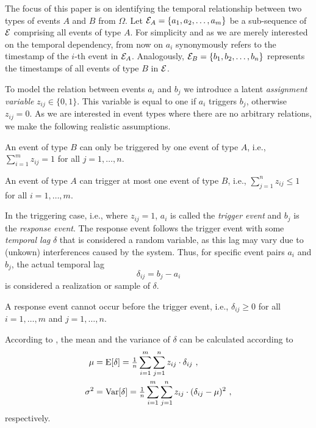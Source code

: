 \documentclass[journal, 10pt]{IEEEtran}
\begin{document}
The focus of this paper is on identifying the temporal relationship between two types of events $A$ and $B$ from $\Omega$. Let $\mathcal E_A = \{a_1, a_2, \ldots, a_m\}$ be a sub-sequence of $\mathcal E$ comprising all events of type $A$. For simplicity and as we are merely interested on the temporal dependency, from now on $a_i$ synonymously refers to the timestamp of the $i$-th event in $\mathcal E_A$. Analogously, $\mathcal E_B = \{b_1, b_2, \ldots, b_n\}$ represents the timestamps of all events of type $B$ in $\mathcal E$.

To model the relation between events $a_i$ and $b_j$ we introduce a latent \emph{assignment variable} $z_{ij} \in \{0,1\}$.
This variable is equal to one if $a_i$ triggers $b_j$, otherwise $z_{ij} = 0$. As we are interested in event types where there are no arbitrary relations, we make the following realistic assumptions.

\begin{Assumption}%
\label{as:one-to-many}
An event of type $B$ can only be triggered by one event of type $A$, i.e., $\textstyle\sum_{i=1}^m z_{ij}=1$  for all $j=1,\ldots,n$.
\end{Assumption}

\begin{Assumption}
\label{as:b}
An event of type $A$ can trigger at most one event of type $B$, i.e., $\textstyle\sum_{j=1}^n z_{ij}\le 1$  for all $i=1,\ldots,m$.
\end{Assumption}

In the triggering case, i.e., where $z_{ij} = 1$, $a_i$ is called the \emph{trigger event} and $b_j$ is the \emph{response event}.
The response event follows the trigger event with some \emph{temporal lag} $\delta$ that is considered a random variable, as this lag may vary due to (unkown) interferences caused by the system. Thus, for specific event pairs $a_i$ and $b_j$, the actual temporal lag
%
\begin{equation}
	\delta_{ij} = b_j - a_i
	\label{eq:temporal-lag}
\end{equation}
%
is considered a realization or sample of $\delta$. 

\begin{Assumption}
\label{as:positive-lags}
A response event cannot occur before the trigger event, i.e., $\delta_{ij}\ge 0$ for all $i=1,\ldots,m$ and $j=1,\ldots,n$.
\end{Assumption}

According to \cite{Zeng2015}, the mean and the variance of $\delta$ can be calculated according to
%
\begin{align}
	\label{eq:mean}
	\mu &= \E[\delta] = \tfrac{1}{n} \sum_{i=1}^m\sum_{j=1}^n z_{ij}\cdot \delta_{ij}~,
	\\
	\label{eq:variance}
	\sigma^2 &= \Var[\delta] = \tfrac{1}{n}\sum_{i=1}^m\sum_{j=1}^n z_{ij} \cdot (\delta_{ij} - \mu)^2~,
\end{align}
%
respectively. 
\end{document}
